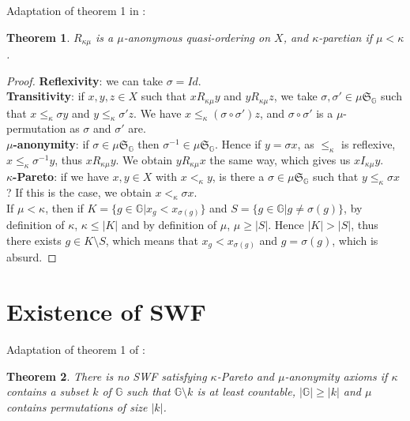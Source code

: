 \documentclass{article}
\newcommand{\G}{\mathbb{G}}
\newtheorem{theorem}{Theorem}
\begin{document}
Adaptation of theorem 1 in \cite{svensson80}:
\begin{theorem}
    $R_{\kappa\mu}$ is a $\mu$-anonymous quasi-ordering on $X$, and $\kappa$-paretian if
    $\mu < \kappa$. %
\end{theorem}
\begin{proof}
    \textbf{Reflexivity}: we can take $\sigma = Id$.\\
    \textbf{Transitivity}: if $x,y,z\in X$ such that $x R_{\kappa\mu} y$ and $y R_{\kappa\mu} z$,
    we take $\sigma,\sigma'\in \mu\mathfrak{S}_\G$ such that $x\leq_\kappa \sigma y$ and
    $y\leq_\kappa \sigma' z$. We have $x\leq_\kappa (\sigma\circ\sigma')z$,
    and $\sigma\circ\sigma'$ is a $\mu$-permutation as $\sigma$ and $\sigma'$ are.\\
    \textbf{$\mu$-anonymity}: if $\sigma\in\mu\mathfrak{S}_\G$
    then $\sigma^{-1}\in\mu\mathfrak{S}_\G$. Hence if $y=\sigma x$, as $\leq_\kappa$ is reflexive,
    $x\leq_\kappa\sigma^{-1}y$, thus $x R_{\kappa\mu} y$. We obtain $y R_{\kappa\mu} x$ the same
    way, which gives us $x I_{\kappa\mu} y$.\\
    \textbf{$\kappa$-Pareto}: if we have $x,y\in X$ with $x<_\kappa y$, is there a
    $\sigma\in \mu\mathfrak{S}_\G$ such that $y\leq_\kappa \sigma x$? If this is the case,
    we obtain $x<_\kappa \sigma x$.\\
    If $\mu < \kappa$, then if $K=\{g\in\G|x_g<x_{\sigma(g)}\}$ and
    $S = \{g\in\G|g \neq\sigma(g)\}$,
    by definition of $\kappa$, $\kappa\leq|K|$ and by definition of $\mu$, $\mu\geq |S|$.
    Hence $|K|>|S|$, thus there exists $g\in K\setminus S$, which means that
    $x_g<x_{\sigma(g)}$ and $g=\sigma(g)$, which is absurd.
\end{proof}

\section{Existence of SWF}

Adaptation of theorem 1 of \cite{basumitra03}:
\begin{theorem}
  There is no SWF satisfying $\kappa$-Pareto and $\mu$-anonymity axioms if $\kappa$ contains a subset $k$ of $\mathbb G$ such that $\mathbb G\setminus k$ is at least countable, $|\mathbb G|\geq |k|$ and $\mu$ contains permutations of size $|k|$.
\end{theorem}
\end{document}
